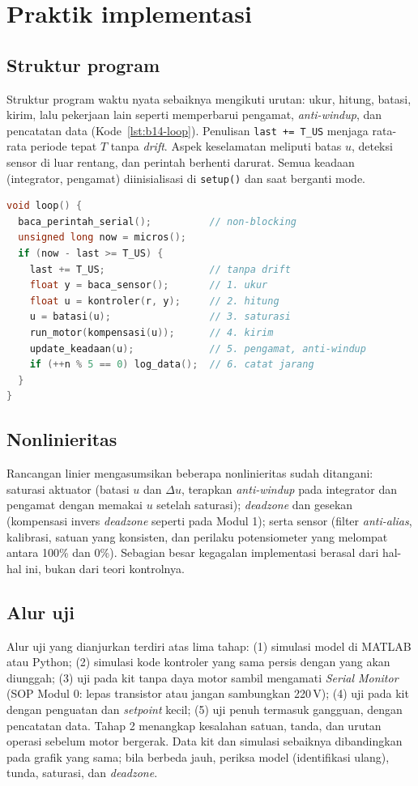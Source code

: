 \section{Praktik implementasi}
\subsection{Struktur program}
Struktur program waktu nyata sebaiknya mengikuti urutan: ukur, hitung, batasi, kirim, lalu pekerjaan lain seperti memperbarui pengamat, \textit{anti-windup}, dan pencatatan data (Kode~\ref{lst:b14-loop}). Penulisan \texttt{last += T\_US} menjaga rata-rata periode tepat $T$ tanpa \textit{drift}. Aspek keselamatan meliputi batas $u$, deteksi sensor di luar rentang, dan perintah berhenti darurat. Semua keadaan (integrator, pengamat) diinisialisasi di \texttt{setup()} dan saat berganti mode.

\begin{lstlisting}[language=C++,caption={Kerangka kalang kontrol waktu nyata},label={lst:b14-loop}]
void loop() {
  baca_perintah_serial();          // non-blocking
  unsigned long now = micros();
  if (now - last >= T_US) {
    last += T_US;                  // tanpa drift
    float y = baca_sensor();       // 1. ukur
    float u = kontroler(r, y);     // 2. hitung
    u = batasi(u);                 // 3. saturasi
    run_motor(kompensasi(u));      // 4. kirim
    update_keadaan(u);             // 5. pengamat, anti-windup
    if (++n % 5 == 0) log_data();  // 6. catat jarang
  }
}
\end{lstlisting}

\subsection{Nonlinieritas}
Rancangan linier mengasumsikan beberapa nonlinieritas sudah ditangani: saturasi aktuator (batasi $u$ dan $\Delta u$, terapkan \textit{anti-windup} pada integrator dan pengamat dengan memakai $u$ setelah saturasi); \textit{deadzone} dan gesekan (kompensasi invers \textit{deadzone} seperti pada Modul 1); serta sensor (filter \textit{anti-alias}, kalibrasi, satuan yang konsisten, dan perilaku potensiometer yang melompat antara 100\% dan 0\%). Sebagian besar kegagalan implementasi berasal dari hal-hal ini, bukan dari teori kontrolnya.

\subsection{Alur uji}
Alur uji yang dianjurkan terdiri atas lima tahap: (1) simulasi model di MATLAB atau Python; (2) simulasi kode kontroler yang sama persis dengan yang akan diunggah; (3) uji pada kit tanpa daya motor sambil mengamati \textit{Serial Monitor} (SOP Modul 0: lepas transistor atau jangan sambungkan 220\,V); (4) uji pada kit dengan penguatan dan \textit{setpoint} kecil; (5) uji penuh termasuk gangguan, dengan pencatatan data. Tahap 2 menangkap kesalahan satuan, tanda, dan urutan operasi sebelum motor bergerak. Data kit dan simulasi sebaiknya dibandingkan pada grafik yang sama; bila berbeda jauh, periksa model (identifikasi ulang), tunda, saturasi, dan \textit{deadzone}.

